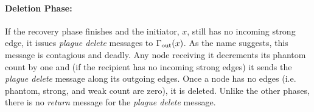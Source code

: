 \paragraph{Deletion Phase:}
If the recovery phase finishes and the initiator, $x$, still has no incoming strong edge, it issues
\emph{plague delete} messages to $\Gamma_{\rm out}(x)$. %
As the name suggests, this message is contagious and deadly. Any node receiving it decrements
its phantom count by one and (if the recipient has no incoming strong edges)
it sends the \emph{plague delete} message along its outgoing edges.
Once a node has no edges (i.e. phantom, strong, and weak count are zero), it is deleted.
Unlike the other phases, there is no \emph{return} message for the \emph{plague delete} message.
\begin{comment}
\begin{lemma}[Plague Delete]
There are O($E_{a}$) plague delete messages sent and they require O(Rad(i,$G_{a}$)) time to finish the plague deletion.
\end{lemma}
\begin{proof}
In every forward step of the plague delete, all outgoing edges are consumed, and the message spreads outward by
a radius of 1. Therefore, in O(Rad(i,$G_{a}$)) time it will spread to the entire subgraph.
\end{proof}

\begin{lemma}
All nodes that have a strong count at the end of phantomization are live.
\end{lemma}
\begin{proof}
Assume there exists a node, $x$, that is dead, but has a strong count. If the
node is dead, it must either (1) be the initiator, or (2) belong to the purely dependent
set. If the $x$ is an initiator, then the strong count comes from the
build set, but there exists a path from $R$ to all nodes in the build set. So option (1)
contradicts our assumption. After
phantomization, all of the nodes in the purely dependent set will only have incoming
phantom edges. So option (2) also contradicts our
assumption.
\end{proof}
\end{comment}
